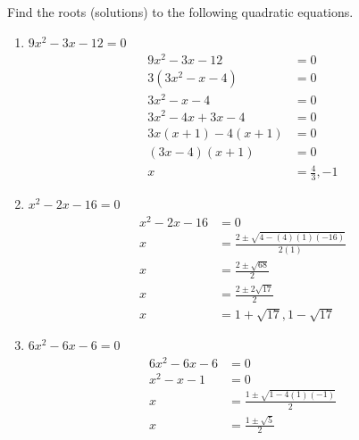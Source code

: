 \documentclass[12pt]{article}
\begin{document}
Find the roots (solutions) to the following quadratic equations.
\begin{enumerate}
    \item $9x^2 - 3x - 12=0$
    \begin{align*}
        9x^2 - 3x - 12 &=0
        \\ 3(3x^2 - x- 4) &= 0
        \\ 3x^2 - x- 4 &= 0
        \\ 3x^2 - 4x + 3x - 4 &= 0
        \\ 3x(x +1) -4(x+1) &= 0
        \\ (3x-4)(x+1) &= 0 
        \\ x&= \frac{4}{3}, -1
    \end{align*}
    
    \item $x^2 - 2x -16 =0$
    \begin{align*}
        x^2 - 2x -16 &=0
        \\ x &= \frac{2 \pm \sqrt{4 - (4)(1)(-16)}}{2(1)}
        \\ x&=  \frac{2 \pm \sqrt{68}}{2}
        \\ x&=  \frac{2 \pm 2 \sqrt{17}}{2}
        \\ x&= 1+\sqrt{17}, 1-\sqrt{17}
    \end{align*}
    \item $6x^2 - 6x -6=0$
    \begin{align*}
        6x^2 - 6x -6 & =0
        \\ x^2 -x -1 &= 0
        \\ x&= \frac{1 \pm \sqrt{1 - 4(1)(-1)}}{2}
        \\ x&= \frac{1\pm \sqrt{5}}{2}
    \end{align*}
\end{enumerate}
\end{document}
